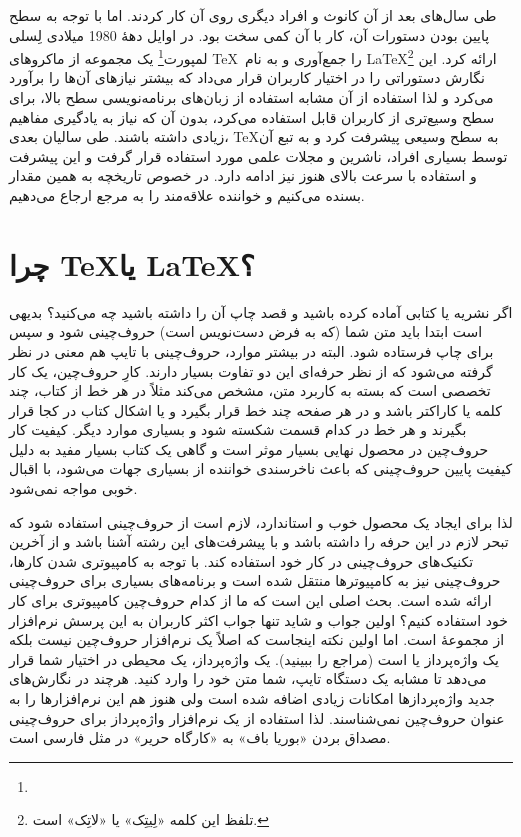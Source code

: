 طی سال‌های بعد از آن کانوث و افراد دیگری روی آن کار کردند. اما با توجه به سطح
پایین بودن دستورات آن، کار با آن کمی سخت بود. در اوایل دهۀ 1980 میلادی 
لِسلی لمپورت\footnote{}
یک مجموعه از ماکروهای \TeX\ را جمع‌آوری و به نام \LaTeX\footnote{تلفظ این
کلمه «لِیتِک» یا «لاتِک» است.} ارائه کرد. این نگارش دستوراتی را در اختیار کاربران قرار می‌داد
که بیشتر نیازهای آن‌ها را برآورد می‌کرد و لذا استفاده از آن مشابه استفاده از زبان‌های
برنامه‌نویسی سطح بالا، برای سطح وسیع‌تری از کاربران قابل استفاده می‌کرد، بدون آن که
نیاز به یادگیری مفاهیم زیادی داشته باشند. طی سالیان بعدی، \TeX به سطح وسیعی
پیشرفت کرد و به تبع آن توسط بسیاری افراد، ناشرین و مجلات علمی مورد استفاده 
قرار گرفت و این پیشرفت و استفاده با سرعت بالای هنوز نیز ادامه دارد. 
در خصوص تاریخچه به همین مقدار بسنده می‌کنیم و خواننده علاقه‌مند را به مرجع
\cite{TeXHis}
ارجاع می‌دهیم.

\section{چرا \TeX یا \LaTeX؟}
اگر نشریه یا کتابی آماده کرده باشید و قصد چاپ آن را داشته باشید چه می‌کنید؟ بدیهی
است ابتدا باید متن شما (که به فرض دست‌نویس است) حروف‌چینی شود و سپس برای 
چاپ فرستاده شود. البته در بیشتر موارد، حروف‌چینی با تایپ هم معنی در نظر گرفته 
می‌شود که از نظر حرفه‌ای این دو تفاوت بسیار دارند. کارِ حروف‌چین، یک کار تخصصی است
که بسته به کاربرد متن، مشخص می‌کند مثلاً در هر خط از کتاب، چند کلمه یا کاراکتر باشد
و در هر صفحه چند خط قرار بگیرد و یا اشکال کتاب در کجا قرار بگیرند و هر خط در 
کدام قسمت شکسته شود و بسیاری موارد دیگر. کیفیت کار حروف‌چین در محصول نهایی
بسیار موثر است و گاهی یک کتاب بسیار مفید به دلیل کیفیت پایین حروف‌چینی
که باعث ناخرسندی خواننده از بسیاری جهات می‌شود، با اقبال خوبی مواجه نمی‌شود.

لذا برای ایجاد یک محصول خوب و استاندارد، لازم است از حروف‌چینی استفاده
شود که تبحر لازم در این حرفه را داشته باشد و با پیشرفت‌های این رشته آشنا باشد
و از آخرین تکنیک‌های حروف‌چینی در کار خود استفاده کند. با توجه به کامپیوتری
شدن کارها، حروف‌چینی نیز به کامپیوترها منتقل شده است و برنامه‌های بسیاری
برای حروف‌چینی ارائه شده است. بحث اصلی این است که ما از کدام حروف‌چین
کامپیوتری برای کار خود استفاده کنیم؟  اولین جواب و شاید تنها جواب اکثر کاربران
به این پرسش نرم‌افزار  از مجموعۀ  است. اما اولین نکته اینجاست
که  اصلاً یک نرم‌افزار حروف‌چین نیست بلکه یک واژه‌پرداز یا 
 است (مراجع \cite{Word,beuty,Art} را ببینید). یک واژه‌پرداز، یک محیطی در اختیار شما قرار 
می‌دهد تا مشابه یک دستگاه تایپ، شما متن خود را وارد کنید. هرچند در نگارش‌های
جدید واژه‌پردازها امکانات زیادی اضافه شده است ولی هنوز هم این نرم‌افزارها را
به عنوان حروف‌چین نمی‌شناسند. لذا استفاده از یک نرم‌افزار واژه‌پرداز برای حروف‌چینی
مصداق بردن «بوریا باف» به «کارگاه حریر» در مثل فارسی است.

